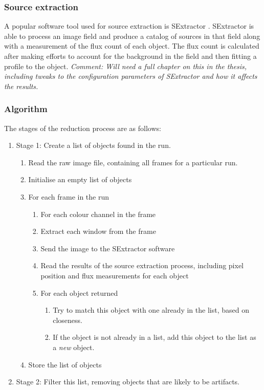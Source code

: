 \documentclass[a4paper,10pt]{article}
\begin{document}
\subsubsection{Source extraction}
A popular software tool used for source extraction is SExtractor \cite{bertin}. SExtractor is able to process an image field and produce a catalog of sources in that field along with a measurement of the flux count of each object. The flux count is calculated after making efforts to account for the background in the field and then fitting a profile to the object. \emph{Comment: Will need a full chapter on this in the thesis, including tweaks to the configuration parameters of SExtractor and how it affects the results.}

\subsubsection{Algorithm}
The stages of the reduction process are as follows:
\begin{enumerate}
	\item Stage 1: Create a list of objects found in the run. 
	\begin{enumerate}
		\item Read the raw image file, containing all frames for a particular run.
		\item Initialise an empty list of objects
		\item For each frame in the run
		\begin{enumerate}
			\item For each colour channel in the frame
			\item Extract each window from the frame
			\item Send the image to the SExtractor software
			\item Read the results of the source extraction process, including pixel position and flux measurements for each object
			\item For each object returned
			\begin{enumerate} 
				\item Try to match this object with one already in the list, based on closeness.
				\item If the object is not already in a list, add this object to the list as a \emph{new} object.
			\end{enumerate}
		\end{enumerate}
		\item Store the list of objects
	\end{enumerate}
	\item Stage 2: Filter this list, removing objects that are likely to be artifacts. 
		
\end{enumerate}
\end{document}

